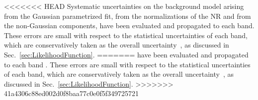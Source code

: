 <<<<<<< HEAD
Systematic uncertainties on the background model arising from the Gaussian parametrized fit, from the normalizations of the NR and from the non-Gaussian components, have been evaluated and propagated to each band. These errors are small with respect to the statistical uncertainties of each band, which are 
conservatively taken as the overall uncertainty~\cite{xe100_run_combination}, as discussed in Sec.~\ref{sec:LikelihoodFunction}.
=======
have been evaluated and propagated to each band 
. These errors are small with respect to the statistical uncertainties of each band, which are conservatively taken as the overall uncertainty~\cite{xe100_run_combination}, as discussed in Sec.~\ref{sec:LikelihoodFunction}.
>>>>>>> 41a4306c88ed002d0f8baa77c0e0f5f349725721

